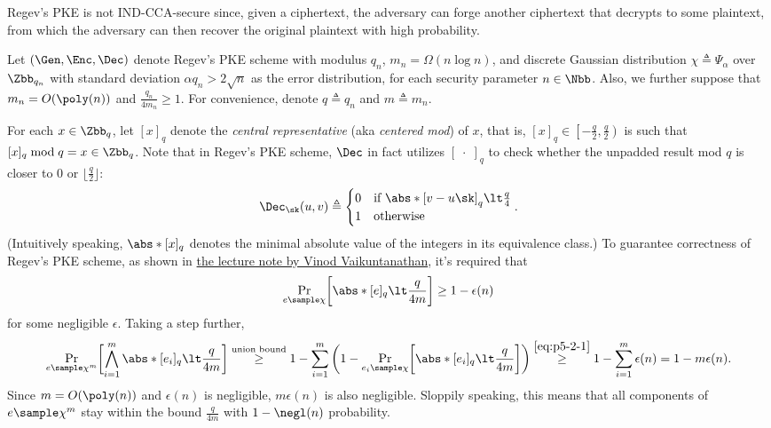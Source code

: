 \begin{answer}[ii]
    \leavevmode\par
    \begin{intuition}
        Regev's PKE is not IND-CCA-secure since, given a ciphertext, the adversary can forge another ciphertext that decrypts to some plaintext, from which the adversary can then recover the original plaintext with high probability.
    \end{intuition}

    Let $(\Gen, \Enc, \Dec)$ denote Regev's PKE scheme with modulus $q_n$, $m_n= \Omega(n\log n)$, and discrete Gaussian distribution $\chi\triangleq \Psi_\alpha$ over $\Zbb_{q_n}$ with standard deviation $\alpha q_n\gt 2\sqrt{n}$ as the error distribution, for each security parameter $n\in \Nbb$. Also, we further suppose that $m_n=O(\poly(n))$ and $\frac{q_n}{4m_n}\ge 1$. For convenience, denote $q\triangleq q_n$ and $m\triangleq m_n$. 
    
    For each $x\in \Zbb_q$, let $[x]_q$ denote the \textit{central representative} (aka \textit{centered mod}) of $x$, that is, $[x]_q\in \left[-\frac{q}{2}, \frac{q}{2}\right)$ is such that $[x]_q \bmod q = x\in \Zbb_q$. Note that in Regev's PKE scheme, $\Dec$ in fact utilizes $[\;\cdot\;]_q$ to check whether the unpadded result mod $q$ is closer to $0$ or $\lfloor\frac{q}{2}\rfloor$:
    \begin{equation}\label{eq:p5-2-3}
        \Dec_\sk(u, v) \triangleq \begin{cases}
            0 & \textrm{if } \abs*{\left[v-u\sk\right]_q }\lt \frac{q}{4}\\
            1 & \textrm{otherwise}
        \end{cases}.
    \end{equation}
    (Intuitively speaking, $\abs*{[x]_q}$ denotes the minimal absolute value of the integers in its equivalence class.)
    To guarantee correctness of Regev's PKE scheme, as shown in \href{https://people.csail.mit.edu/vinodv/6876-Fall2015/L13.pdf}{the lecture note by Vinod Vaikuntanathan}, it's required that
    \begin{equation}\label{eq:p5-2-1}
        \Pr_{e\sample\chi}\biggl[ \abs*{[e]_q} \lt \frac{q}{4m}\biggr] \ge 1-\epsilon(n)
    \end{equation}
    for some negligible $\epsilon$.
    Taking a step further,
    \begin{equation}\label{eq:p5-2-2}
        \Pr_{e\sample\chi^m}\biggl[ \bigwedge_{i=1}^m \abs*{[e_i]_q} \lt \frac{q}{4m}\biggr]
        \stackrel{\textrm{union bound}}\ge 1- \sum_{i=1}^m \left(1- \Pr_{e_i\sample\chi}\biggl[ \abs*{[e_i]_q} \lt \frac{q}{4m}\biggr] \right)
        \stackrel{\eqref{eq:p5-2-1}}\ge 1- \sum_{i=1}^m \epsilon(n) = 1-m\epsilon(n).
    \end{equation}
    Since $m=O(\poly(n))$ and $\epsilon(n)$ is negligible, $m\epsilon(n)$ is also negligible. Sloppily speaking, this means that all components of $e\sample\chi^m$ stay within the bound $\frac{q}{4m}$ with $1-\negl(n)$ probability. 
    

\end{answer}
